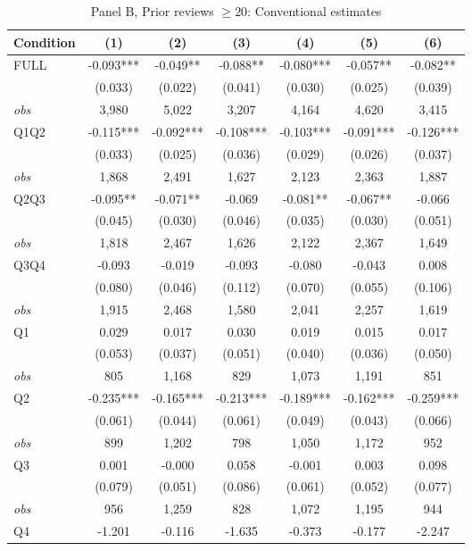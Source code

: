 \documentclass[11pt]{article}
\begin{document}
\begin{table}[!htbp]
\centering
\caption{Panel B, Prior reviews $\geq 20$: Conventional estimates}
\label{tab:trim00:b:prior_reviews_ge20}
\small
\begin{tabular}{lcccccc}
\toprule
Condition & (1) & (2) & (3) & (4) & (5) & (6) \\
\midrule
FULL & -0.093*** & -0.049** & -0.088** & -0.080*** & -0.057** & -0.082** \\
 & (0.033) & (0.022) & (0.041) & (0.030) & (0.025) & (0.039) \\
\textit{obs} & 3,980 & 5,022 & 3,207 & 4,164 & 4,620 & 3,415 \\
Q1Q2 & -0.115*** & -0.092*** & -0.108*** & -0.103*** & -0.091*** & -0.126*** \\
 & (0.033) & (0.025) & (0.036) & (0.029) & (0.026) & (0.037) \\
\textit{obs} & 1,868 & 2,491 & 1,627 & 2,123 & 2,363 & 1,887 \\
Q2Q3 & -0.095** & -0.071** & -0.069 & -0.081** & -0.067** & -0.066 \\
 & (0.045) & (0.030) & (0.046) & (0.035) & (0.030) & (0.051) \\
\textit{obs} & 1,818 & 2,467 & 1,626 & 2,122 & 2,367 & 1,649 \\
Q3Q4 & -0.093 & -0.019 & -0.093 & -0.080 & -0.043 & 0.008 \\
 & (0.080) & (0.046) & (0.112) & (0.070) & (0.055) & (0.106) \\
\textit{obs} & 1,915 & 2,468 & 1,580 & 2,041 & 2,257 & 1,619 \\
Q1 & 0.029 & 0.017 & 0.030 & 0.019 & 0.015 & 0.017 \\
 & (0.053) & (0.037) & (0.051) & (0.040) & (0.036) & (0.050) \\
\textit{obs} &   805 & 1,168 &   829 & 1,073 & 1,191 &   851 \\
Q2 & -0.235*** & -0.165*** & -0.213*** & -0.189*** & -0.162*** & -0.259*** \\
 & (0.061) & (0.044) & (0.061) & (0.049) & (0.043) & (0.066) \\
\textit{obs} &   899 & 1,202 &   798 & 1,050 & 1,172 &   952 \\
Q3 & 0.001 & -0.000 & 0.058 & -0.001 & 0.003 & 0.098 \\
 & (0.079) & (0.051) & (0.086) & (0.061) & (0.052) & (0.077) \\
\textit{obs} &   956 & 1,259 &   828 & 1,072 & 1,195 &   944 \\
Q4 & -1.201 & -0.116 & -1.635 & -0.373 & -0.177 & -2.247 \\

\end{tabular}
\end{table}
\end{document}
